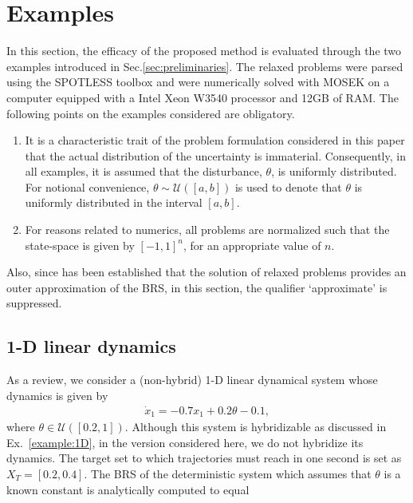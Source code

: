   \section{Examples}
\label{sec:examples}
  In this section, the efficacy of the proposed method is evaluated through the two examples introduced in Sec.\ref{sec:preliminaries}. The relaxed problems were parsed using the SPOTLESS toolbox \cite{spotless} and were numerically solved with MOSEK on a computer equipped with a Intel Xeon W3540 processor and 12GB of RAM.
  The following points on the examples considered are obligatory.
  \begin{enumerate}
    \item It is a characteristic trait of the problem formulation considered in this paper that the actual distribution of the uncertainty is immaterial. Consequently, in all examples, it is assumed that the disturbance, $\theta$, is uniformly distributed. For notional convenience, $\theta\sim\mathcal U([a,b])$ is used to denote that $\theta$ is uniformly distributed in the interval $[a,b]$.
    \item For reasons related to numerics, all problems are normalized such that the state-space is given by $[-1,1]^n$, for an appropriate value of $n$.
  \end{enumerate}
  Also, since has been established that the solution of relaxed problems provides an outer approximation of the BRS, in this section, the qualifier `approximate' is suppressed.
  \subsection{1-D linear dynamics}
  As a review, we consider a (non-hybrid) 1-D linear dynamical system whose dynamics is given by
  \begin{align}
	\dot x_1 = -0.7x_1+0.2\theta-0.1,
\end{align}
where $\theta\in \mathcal U([0.2,1])$.
Although this system is hybridizable as discussed in Ex.~\ref{example:1D}, in the version considered here, we do not hybridize its dynamics. The target set to which trajectories must reach in one second is set as $X_T=[0.2,0.4]$. The BRS of the deterministic system which assumes that $\theta$ is a known constant is analytically computed to equal

